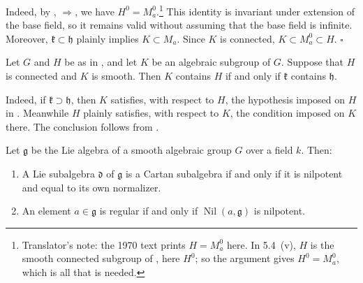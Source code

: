 Indeed, by , \(\Rightarrow\),
we have \(H^0=M_a^0\).\footnote{Translator's note: the 1970 text prints \(H=M_a^0\) here. In
5.4~(v), \(H\) is the smooth connected subgroup of
, here \(H^0\); so the
argument gives \(H^0=M_a^0\), which is all that is needed.}
This identity is invariant under extension of the base field, so it
remains valid without assuming that the base field is infinite.
Moreover, \(\mathfrak k\subset\mathfrak h\) plainly implies
\(K\subset M_a\). Since \(K\) is connected,
\(K\subset M_a^0\subset H\). \hfill\(\square\)

\begin{corollary}
Let \(G\) and \(H\) be as in , and let \(K\) be an
algebraic subgroup of \(G\). Suppose that \(H\) is connected and \(K\)
is smooth. Then \(K\) contains \(H\) if and only if
\(\mathfrak k\) contains \(\mathfrak h\).
\end{corollary}

Indeed, if \(\mathfrak k\supset\mathfrak h\), then \(K\) satisfies,
with respect to \(H\), the hypothesis imposed on \(H\) in
. Meanwhile \(H\) plainly satisfies, with respect to
\(K\), the condition imposed on \(K\) there. The conclusion follows
from .

\begin{corollary}
Let \(\mathfrak g\) be the Lie algebra of a smooth algebraic group
\(G\) over a field \(k\). Then:
\begin{enumerate}
  \item[a)]
  A Lie subalgebra \(\mathfrak d\) of \(\mathfrak g\) is a Cartan
  subalgebra if and only if it is nilpotent and equal to its own
  normalizer.

  \item[b)]
  An element \(a\in\mathfrak g\) is regular if and only if
  \(\operatorname{Nil}(a,\mathfrak g)\) is nilpotent.
\end{enumerate}
\end{corollary}


